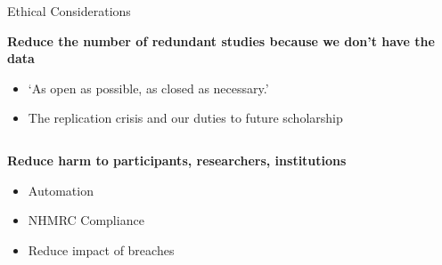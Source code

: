 \documentclass[aspectratio=1610, 11pt]{beamer} %
\begin{document}
\begin{frame}{Ethical Considerations}

\textbf{Reduce the number of redundant studies because we don't have the data}
\begin{itemize}
    \item `As open as possible, as closed as necessary.' \parencite{European_Commission2016-ai}
    \item The replication crisis and our duties to future scholarship \parencite{Hochstrasser2020-mr,  National_Academies_of_Sciences_Engineering_and_Medicine2019-da, Reed2014-aa, Franco2014-oy}
    \end{itemize}


\vspace{5mm}
\begin{columns}[t]
\begin{column}{.35\textwidth}
\textbf{Reduce harm to participants, researchers, institutions}    
\begin{itemize}
    \item Automation
    \item NHMRC Compliance
    \item Reduce impact of breaches
    

\end{itemize}
\end{column}
\end{columns}
\end{frame}
\end{document}
